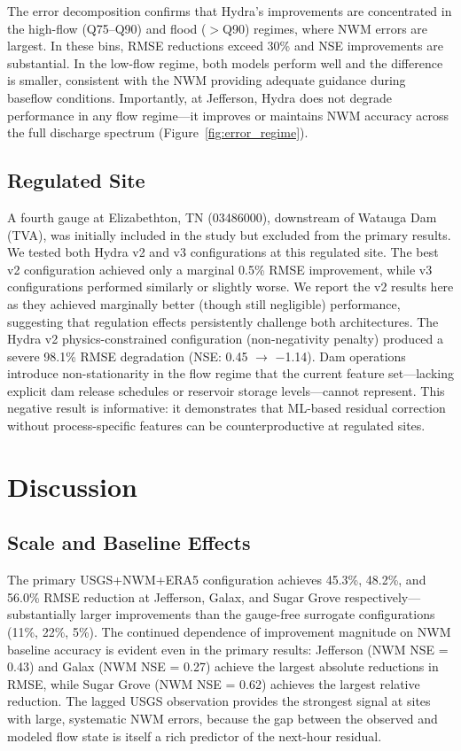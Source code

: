 \documentclass[draft]{agujournal2019}
\begin{document}
The error decomposition confirms that Hydra's improvements are concentrated in the high-flow (Q75--Q90) and flood ($>$Q90) regimes, where NWM errors are largest. In these bins, RMSE reductions exceed 30\% and NSE improvements are substantial. In the low-flow regime, both models perform well and the difference is smaller, consistent with the NWM providing adequate guidance during baseflow conditions. Importantly, at Jefferson, Hydra does not degrade performance in any flow regime---it improves or maintains NWM accuracy across the full discharge spectrum (Figure~\ref{fig:error_regime}).

\subsection{Regulated Site}

A fourth gauge at Elizabethton, TN (03486000), downstream of Watauga Dam (TVA), was initially included in the study but excluded from the primary results. We tested both Hydra v2 and v3 configurations at this regulated site. The best v2 configuration achieved only a marginal 0.5\% RMSE improvement, while v3 configurations performed similarly or slightly worse. We report the v2 results here as they achieved marginally better (though still negligible) performance, suggesting that regulation effects persistently challenge both architectures. The Hydra v2 physics-constrained configuration (non-negativity penalty) produced a severe 98.1\% RMSE degradation (NSE: 0.45 $\to$ $-$1.14). Dam operations introduce non-stationarity in the flow regime that the current feature set---lacking explicit dam release schedules or reservoir storage levels---cannot represent. This negative result is informative: it demonstrates that ML-based residual correction without process-specific features can be counterproductive at regulated sites.


\section{Discussion}

\subsection{Scale and Baseline Effects}

The primary USGS+NWM+ERA5 configuration achieves 45.3\%, 48.2\%, and 56.0\% RMSE reduction at Jefferson, Galax, and Sugar Grove respectively---substantially larger improvements than the gauge-free surrogate configurations (11\%, 22\%, 5\%). The continued dependence of improvement magnitude on NWM baseline accuracy is evident even in the primary results: Jefferson (NWM NSE = 0.43) and Galax (NWM NSE = 0.27) achieve the largest absolute reductions in RMSE, while Sugar Grove (NWM NSE = 0.62) achieves the largest relative reduction. The lagged USGS observation provides the strongest signal at sites with large, systematic NWM errors, because the gap between the observed and modeled flow state is itself a rich predictor of the next-hour residual.
\end{document}
